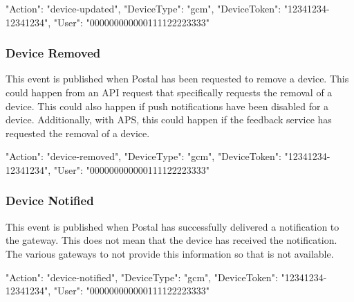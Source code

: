 \documentclass[12pt]{article}
\begin{document}
\begin{Terminal}
{
  "Action": "device-updated",
  "DeviceType": "gcm",
  "DeviceToken": "12341234-12341234",
  "User": "000000000000111122223333"
}
\end{Terminal}

\subsubsection{Device Removed}

This event is published when Postal has been requested to remove a device.
This could happen from an API request that specifically requests the removal of a device.
This could also happen if push notifications have been disabled for a device.
Additionally, with APS, this could happen if the feedback service has requested the removal of a device.

\begin{Terminal}
{
  "Action": "device-removed",
  "DeviceType": "gcm",
  "DeviceToken": "12341234-12341234",
  "User": "000000000000111122223333"
}
\end{Terminal}

\subsubsection{Device Notified}

This event is published when Postal has successfully delivered a notification to the gateway.
This does not mean that the device has received the notification.
The various gateways to not provide this information so that is not available.

\begin{Terminal}
{
  "Action": "device-notified",
  "DeviceType": "gcm",
  "DeviceToken": "12341234-12341234",
  "User": "000000000000111122223333"
}
\end{Terminal}
\end{document}
